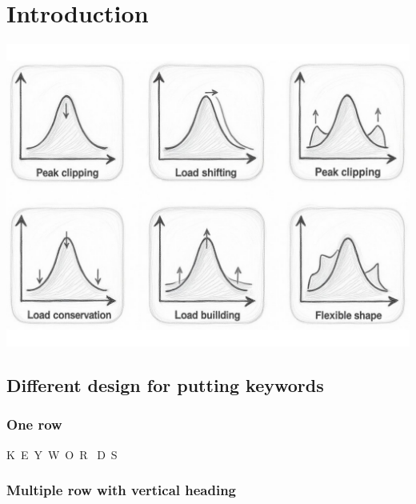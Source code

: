 \chapter{Introduction}
\label{chapter-1}
\vfill
\begin{center}
\includegraphics[width=\textwidth]{figures/chapter_1/type_flex_sketch.pdf}
\end{center}
\newpage
\section{Different design for putting keywords}
\subsection{One row}
\noindent
K\ E\ Y\ W\ O\ R \ D\ S

\noindent
{} \hfill
{} \hfill
{} \hfill
{}

\vspace{1 em}
\noindent
\subsection{Multiple row with vertical heading}

